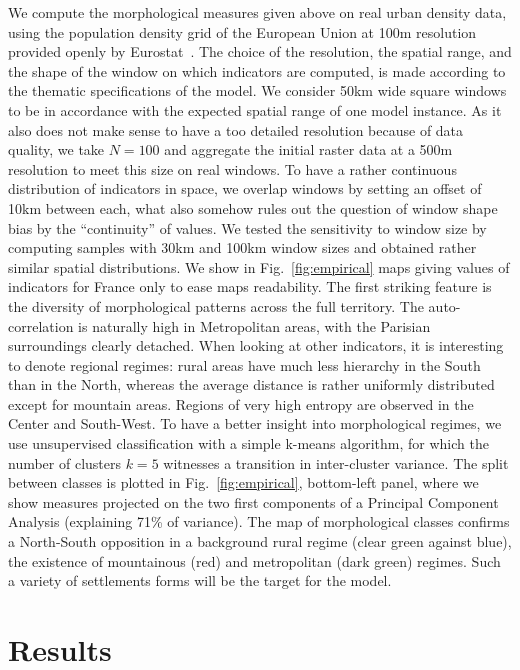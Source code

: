 \documentclass[10pt,letterpaper]{article}
\begin{document}
We compute the morphological measures given above on real urban density data, using the population density grid of the European Union at 100m resolution provided openly by Eurostat~\cite{eurostat}. The choice of the resolution, the spatial range, and the shape of the window on which indicators are computed, is made according to the thematic specifications of the model. We consider 50km wide square windows to be in accordance with the expected spatial range of one model instance. As it also does not make sense to have a too detailed resolution because of data quality, we take $N=100$ and aggregate the initial raster data at a 500m resolution to meet this size on real windows. To have a rather continuous distribution of indicators in space, we overlap windows by setting an offset of 10km between each, what also somehow rules out the question of window shape bias by the ``continuity'' of values. We tested the sensitivity to window size by computing samples with 30km and 100km window sizes and obtained rather similar spatial distributions. We show in Fig.~\ref{fig:empirical} maps giving values of indicators for France only to ease maps readability. The first striking feature is the diversity of morphological patterns across the full territory. The auto-correlation is naturally high in Metropolitan areas, with the Parisian surroundings clearly detached. When looking at other indicators, it is interesting to denote regional regimes: rural areas have much less hierarchy in the South than in the North, whereas the average distance is rather uniformly distributed except for mountain areas. Regions of very high entropy are observed in the Center and South-West. To have a better insight into morphological regimes, we use unsupervised classification with a simple k-means algorithm, for which the number of clusters $k=5$ witnesses a transition in inter-cluster variance. The split between classes is plotted in Fig.~\ref{fig:empirical}, bottom-left panel, where we show measures projected on the two first components of a Principal Component Analysis (explaining 71\% of variance). The map of morphological classes confirms a North-South opposition in a background rural regime (clear green against blue), the existence of mountainous (red) and metropolitan (dark green) regimes. Such a variety of settlements forms will be the target for the model.





\section*{Results}
\end{document}
